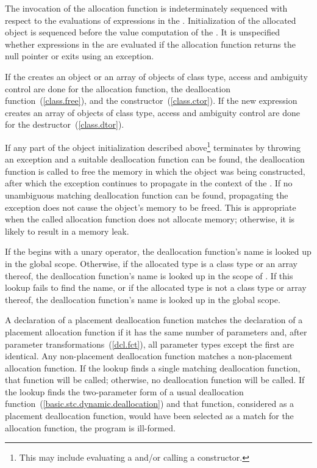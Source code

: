 \pnum
{}%
%
The invocation of the allocation function is indeterminately sequenced with respect to
the evaluations of expressions in the . Initialization of
the allocated object is sequenced before the
%
value computation of the
.
%
It is unspecified whether expressions in the  are
evaluated if the allocation function returns the null pointer or exits
using an exception.

\pnum
If the  creates an object or an array of
objects of class type, access and ambiguity control are done for the
allocation function, the deallocation function~(\ref{class.free}), and
the constructor~(\ref{class.ctor}). If the new expression creates an
array of objects of class type, access and ambiguity control are done
for the destructor~(\ref{class.dtor}).

\pnum
{}%
If any part of the object initialization described above\footnote{This may
include evaluating a  and/or calling
a constructor.}
terminates by throwing an exception and a suitable deallocation function
can be found, the deallocation function is called to free the memory in
which the object was being constructed, after which the exception
continues to propagate in the context of the .
If no unambiguous matching deallocation function can be found,
propagating the exception does not cause the object's memory to be
freed.
\enternote 
This is appropriate when the called allocation function does not
allocate memory; otherwise, it is likely to result in a memory leak.
\exitnote 

\pnum
If the  begins with a unary \tcode{::}
operator, the deallocation function's name is looked up in the global
scope. Otherwise, if the allocated type is a class type  or an
array thereof, the deallocation function's name is looked up in the
scope of . If this lookup fails to find the name, or if the
allocated type is not a class type or array thereof, the deallocation
function's name is looked up in the global scope.

\pnum
A declaration of a placement deallocation function matches the
declaration of a placement allocation function if it has the same number
of parameters and, after parameter transformations~(\ref{dcl.fct}), all
parameter types except the first are identical. Any non-placement
deallocation function matches a non-placement allocation function. If
the lookup finds a single matching deallocation function, that function
will be called; otherwise, no deallocation function will be called. If
the lookup finds the two-parameter form of a usual deallocation
function~(\ref{basic.stc.dynamic.deallocation}) and that function,
considered as a placement deallocation function, would have been
selected as a match for the allocation function, the program is
ill-formed.
\enterexample

